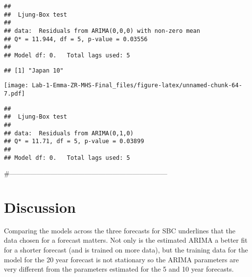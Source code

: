 \documentclass[
]{article}
\newenvironment{Shaded}{\begin{snugshade}}{\end{snugshade}}
\newcommand{\CommentTok}[1]{\textcolor[rgb]{0.56,0.35,0.01}{\textit{#1}}}
\newcommand{\ControlFlowTok}[1]{\textcolor[rgb]{0.13,0.29,0.53}{\textbf{#1}}}
\newcommand{\DecValTok}[1]{\textcolor[rgb]{0.00,0.00,0.81}{#1}}
\newcommand{\FunctionTok}[1]{\textcolor[rgb]{0.00,0.00,0.00}{#1}}
\newcommand{\NormalTok}[1]{#1}
\newcommand{\OtherTok}[1]{\textcolor[rgb]{0.56,0.35,0.01}{#1}}
\newcommand{\SpecialCharTok}[1]{\textcolor[rgb]{0.00,0.00,0.00}{#1}}
\begin{document}
\begin{verbatim}
## 
##  Ljung-Box test
## 
## data:  Residuals from ARIMA(0,0,0) with non-zero mean
## Q* = 11.944, df = 5, p-value = 0.03556
## 
## Model df: 0.   Total lags used: 5
\end{verbatim}

\begin{Shaded}
\end{Shaded}

\begin{verbatim}
## [1] "Japan 10"
\end{verbatim}

\texttt{[image: Lab-1-Emma-ZR-MHS-Final\_files/figure-latex/unnamed-chunk-64-7.pdf]}

\begin{verbatim}
## 
##  Ljung-Box test
## 
## data:  Residuals from ARIMA(0,1,0)
## Q* = 11.71, df = 5, p-value = 0.03899
## 
## Model df: 0.   Total lags used: 5
\end{verbatim}

\#---------------------------------------------------------------------

\hypertarget{discussion}{%
\section{Discussion}\label{discussion}}

Comparing the models across the three forecasts for SBC underlines that
the data chosen for a forecast matters. Not only is the estimated ARIMA
a better fit for a shorter forecast (and is trained on more data), but
the training data for the model for the 20 year forecast is not
stationary so the ARIMA parameters are very different from the
parameters estimated for the 5 and 10 year forecasts.
\end{document}
